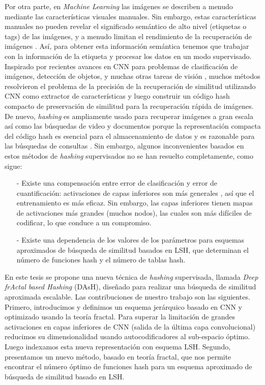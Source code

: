 Por otra parte, en \textit{Machine Learning} las imágenes se describen a menudo mediante las características visuales manuales.  Sin embargo, estas características manuales no pueden revelar el significado semántico de alto nivel (etiquetas o tags) de las imágenes, y a menudo limitan el rendimiento de la recuperación de imágenes \cite{Li:2015:RSS:2881665.2882186}. Así, para obtener esta información semántica tenemos que trabajar con la información de la etiqueta y procesar los datos en un modo supervisado. Inspirado por recientes avances en \acf{CNN} para problemas de clasificación de imágenes, detección de objetos, y muchas otras tareas de visión \cite{ImageNet,NIPS2013_5207,LiuWJJC12}, muchos métodos resolvieron el problema de la precisión de la recuperación de similitud utilizando CNN como extractor de características y luego construir un código hash compacto de preservación de similitud para la recuperación rápida de imágenes.   De nuevo, \textit{hashing} es ampliamente usado para recuperar imágenes a gran escala así como las búsquedas de video y documentos porque la representación compacta del código hash es esencial para el almacenamiento de datos y es razonable para las búsquedas de consultas \cite{conf/cvpr/ShenSLS15}.  Sin embargo, algunos inconvenientes basados en estos métodos de \textit{hashing} supervisados no se han resuelto completamente, como sigue:


\begin{itemize}

\item[-]  Existe una compensación entre error de clasificación y error de cuantificación: activaciones de capas inferiores son más generales \cite{DBLP:journals/corr/YosinskiCBL14}, así que el entrenamiento es más eficaz. Sin embargo, las capas inferiores tienen mapas de activaciones más grandes (muchos nodos), las cuales son más difíciles de codificar, lo que conduce a un compromiso. 
	
 
\item[-] Existe una dependencia de los valores de los parámetros para esquemas aproximados de búsqueda de similitud basados en LSH, que determinan el número de funciones hash y el número de tablas hash.  
 
\end{itemize}

En este tesis  se propone una nueva técnica de \textit{hashing} supervisada,  llamada  \textit{Deep frActal based  Hashing} (DAsH),  diseñado para realizar una búsqueda de similitud aproximada escalable. Las contribuciones de nuestro trabajo son las siguientes. Primero,  introducimos y definimos un esquema jerárquico basado en CNN y optimizado usando la teoría fractal. Para superar la limitación de grandes activaciones en capas inferiores de CNN (salida de la última capa convolucional) reducimos su dimensionalidad usando autocodificadores al sub-espacio óptimo. Luego indexamos esta nueva representación con esquema LSH.  Segundo, presentamos un nuevo método, basado en teoría fractal, que nos permite encontrar el número óptimo de funciones hash para un esquema aproximado de búsqueda de similitud basado en LSH.

